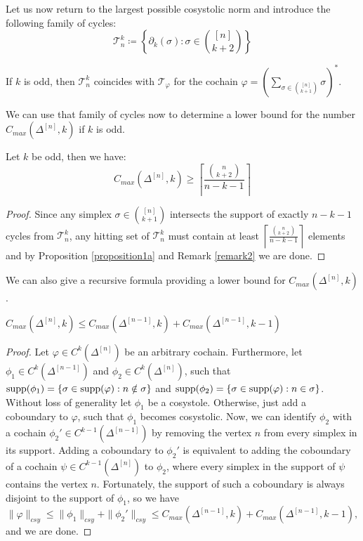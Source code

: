 Let us now return to the largest possible cosystolic norm and introduce the following family of cycles:
\[
\mathcal{T}_n^k\coloneqq \left\{\partial_k(\sigma):\sigma\in\binom{[n]}{k+2}\right\}
\]

\begin{rem}\label{remark2}
If \(k\) is odd, then \(\mathcal{T}_n^k\) coincides with \(\mathcal{T}_{\varphi}\) for the cochain \(\varphi=\left(\sum\limits_{\sigma\in\binom{[n]}{k+1}}\sigma\right)^*\).
\end{rem}

We can use that family of cycles now to determine a lower bound for the number \(C_{max}(\Delta^{[n]},k)\) if \(k\) is odd.

\begin{prop}\label{proposition11}
Let \(k\) be odd, then we have:
\[
C_{max}(\Delta^{[n]},k)\geq \left\lceil\frac{\binom{n}{k+2}}{n-k-1}\right\rceil
\]
\begin{proof}
Since any simplex \(\sigma\in\binom{[n]}{k+1}\) intersects the support of exactly \(n-k-1\) cycles from \(\mathcal{T}_n^k\), any hitting set of \(\mathcal{T}_n^k\) must contain at least \(\left\lceil\frac{\binom{n}{k+2}}{n-k-1}\right\rceil\) elements and by Proposition \ref{proposition1a} and Remark \ref{remark2} we are done.
\end{proof}
\end{prop}

We can also give a recursive formula providing a lower bound for \(C_{max}(\Delta^{[n]},k)\).

\begin{prop}\label{proposition232}
\(C_{max}(\Delta^{[n]},k)\leq C_{max}(\Delta^{[n-1]},k)+C_{max}(\Delta^{[n-1]},k-1)\)
\begin{proof}
Let \(\varphi\in C^k(\Delta^{[n]})\) be an arbitrary cochain. Furthermore, let \(\phi_1\in C^k(\Delta^{[n-1]})\) and \(\phi_2\in C^k(\Delta^{[n]})\), such that \(\mathrm{supp}(\phi_1)=\{\sigma\in\mathrm{supp}(\varphi):n\notin\sigma\}\) and \(\mathrm{supp}(\phi_2)=\{\sigma\in\mathrm{supp}(\varphi):n\in\sigma\}\). Without loss of generality let \(\phi_1\) be a cosystole. Otherwise, just add a coboundary to \(\varphi\), such that \(\phi_1\) becomes cosystolic. Now, we can identify \(\phi_2\) with a cochain \(\phi_2'\in C^{k-1}(\Delta^{[n-1]})\) by removing the vertex \(n\) from every simplex in its support. Adding a coboundary to \(\phi_2'\) is equivalent to adding the coboundary of a cochain \(\psi\in C^{k-1}(\Delta^{[n]})\) to \(\phi_2\), where every simplex in the support of \(\psi\) contains the vertex \(n\). Fortunately, the support of such a coboundary is always disjoint to the support of \(\phi_1\), so we have
\[
\|\varphi\|_{csy}\leq\|\phi_1\|_{csy}+\|\phi_2'\|_{csy}\leq C_{max}(\Delta^{[n-1]},k)+C_{max}(\Delta^{[n-1]},k-1),
\]
and we are done.
\end{proof}
\end{prop}

